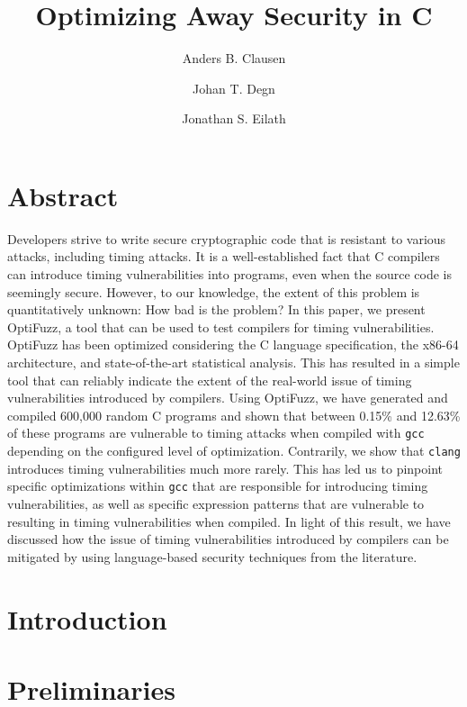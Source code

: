 \documentclass[10pt]{article}
\title{
  Optimizing Away Security in C
}
\author{Anders B. Clausen \and Johan T. Degn \and Jonathan S. Eilath}
\begin{document}
\maketitle
\thispagestyle{empty}


\section*{Abstract}
Developers strive to write secure cryptographic code that is resistant to various attacks, including timing attacks.
It is a well-established fact that C compilers can introduce timing vulnerabilities into programs, even when the source code is seemingly secure.
However, to our knowledge, the extent of this problem is quantitatively unknown: 
How bad is the problem?
In this paper, we present OptiFuzz, a tool that can be used to test compilers for timing vulnerabilities.
OptiFuzz has been optimized considering the C language specification, the x86-64 architecture, and state-of-the-art statistical analysis.
This has resulted in a simple tool that can reliably indicate the extent of the real-world issue of timing vulnerabilities introduced by compilers.
Using OptiFuzz, we have generated and compiled 600,000 random C programs and shown that between 0.15\% and 12.63\% of these programs are vulnerable to timing attacks when compiled with \texttt{gcc} depending on the configured level of optimization.
Contrarily, we show that \texttt{clang} introduces timing vulnerabilities much more rarely.
This has led us to pinpoint specific optimizations within \texttt{gcc} that are responsible for introducing timing vulnerabilities, as well as specific expression patterns that are vulnerable to resulting in timing vulnerabilities when compiled.
In light of this result, we have discussed how the issue of timing vulnerabilities introduced by compilers can be mitigated by using language-based security techniques from the literature.

\section{Introduction}


\section{Preliminaries}

\end{document}
